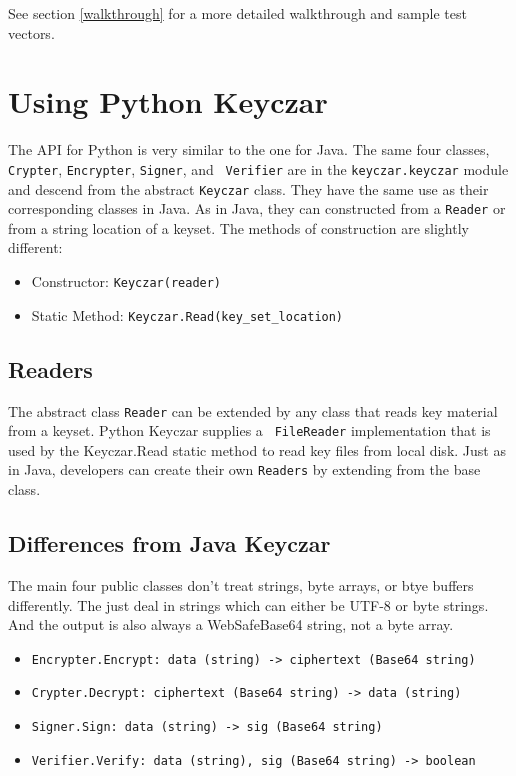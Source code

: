 \documentclass{llncs}
\begin{document}
See section \ref{walkthrough} for a more detailed walkthrough and
sample test vectors.

\section{Using Python Keyczar}

The API for Python is very similar to the one for Java. The same four
classes, {\tt Crypter}, {\tt Encrypter}, {\tt Signer}, and {\tt
  Verifier} are in the {\tt keyczar.keyczar} module and descend from
the abstract {\tt Keyczar} class.  They have the same use as their
corresponding classes in Java. As in Java, they can constructed from a
{\tt Reader} or from a string location of a keyset. The methods of
construction are slightly different:

\begin{itemize}
  \item Constructor: {\tt Keyczar(reader)}
  \item Static Method: \verb|Keyczar.Read(key_set_location)|
\end{itemize}

\subsection{Readers}

The abstract class {\tt Reader} can be extended by any class that
reads key material from a keyset. Python Keyczar supplies a {\tt
  FileReader} implementation that is used by the {Keyczar.Read} static
method to read key files from local disk. Just as in Java, developers
can create their own {\tt Readers} by extending from the base class.

\subsection{Differences from Java Keyczar}

The main four public classes don't treat strings, byte arrays, or btye
buffers differently. The just deal in strings which can either be
UTF-8 or byte strings. And the output is also always a WebSafeBase64
string, not a byte array.


\begin{itemize}
  \item {\tt Encrypter.Encrypt: data (string) -> ciphertext (Base64 string)}
  \item {\tt Crypter.Decrypt: ciphertext (Base64 string) -> data (string)}
  \item {\tt Signer.Sign: data (string) -> sig (Base64 string)}
  \item {\tt Verifier.Verify: data (string), sig (Base64 string) -> boolean}
\end{itemize}
\end{document}
